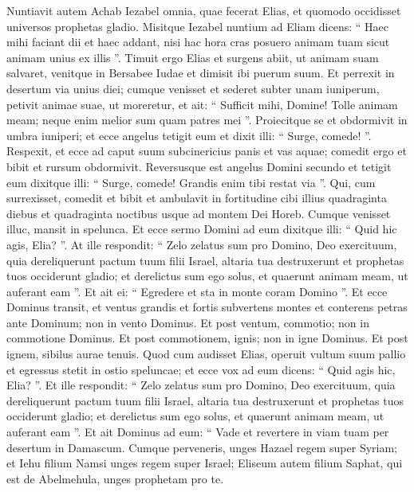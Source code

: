 \begin{biblechapter}
\begin{biblechapter}
\begin{biblechapter}
\begin{biblechapter}
\begin{biblechapter}
\begin{biblechapter}
\begin{biblechapter}
\begin{biblechapter}
\begin{biblechapter}
\begin{biblechapter}
\begin{biblechapter}
\begin{biblechapter}
\begin{biblechapter}
\begin{biblechapter}
\begin{biblechapter}
\begin{biblechapter}
\begin{biblechapter}
\begin{biblechapter}
\begin{biblechapter}
\verse Nuntiavit autem Achab Iezabel omnia, quae fecerat Elias, et quomodo occidisset universos prophetas gladio. 
\verse Misitque Iezabel nuntium ad Eliam dicens: “ Haec mihi faciant dii et haec addant, nisi hac hora cras posuero animam tuam sicut animam unius ex illis ”. 
\verse Timuit ergo Elias et surgens abiit, ut animam suam salvaret, venitque in Bersabee Iudae et dimisit ibi puerum suum. 
\verse Et perrexit in desertum via unius diei; cumque venisset et sederet subter unam iuniperum, petivit animae suae, ut moreretur, et ait: “ Sufficit mihi, Domine! Tolle animam meam; neque enim melior sum quam patres mei ”. 
\verse Proiecitque se et obdormivit in umbra iuniperi; et ecce angelus tetigit eum et dixit illi: “ Surge, comede! ”. 
\verse Respexit, et ecce ad caput suum subcinericius panis et vas aquae; comedit ergo et bibit et rursum obdormivit. 
 \verse Reversusque est angelus Domini secundo et tetigit eum dixitque illi: “ Surge, comede! Grandis enim tibi restat via ”. 
\verse Qui, cum surrexisset, comedit et bibit et ambulavit in fortitudine cibi illius quadraginta diebus et quadraginta noctibus usque ad montem Dei Horeb.
 \verse Cumque venisset illuc, mansit in spelunca. Et ecce sermo Domini ad eum dixitque illi: “ Quid hic agis, Elia? ”. 
\verse At ille respondit: “ Zelo zelatus sum pro Domino, Deo exercituum, quia dereliquerunt pactum tuum filii Israel, altaria tua destruxerunt et prophetas tuos occiderunt gladio; et derelictus sum ego solus, et quaerunt animam meam, ut auferant eam ”. 
\verse Et ait ei: “ Egredere et sta in monte coram Domino ”. Et ecce Dominus transit, et ventus grandis et fortis subvertens montes et conterens petras ante Dominum; non in vento Dominus. Et post ventum, commotio; non in commotione Dominus. 
\verse Et post commotionem, ignis; non in igne Dominus. Et post ignem, sibilus aurae tenuis. 
\verse Quod cum audisset Elias, operuit vultum suum pallio et egressus stetit in ostio speluncae; et ecce vox ad eum dicens: “ Quid agis hic, Elia? ”. 
 \verse Et ille respondit: “ Zelo zelatus sum pro Domino, Deo exercituum, quia dereliquerunt pactum tuum filii Israel, altaria tua destruxerunt et prophetas tuos occiderunt gladio; et derelictus sum ego solus, et quaerunt animam meam, ut auferant eam ”.
 \verse Et ait Dominus ad eum: “ Vade et revertere in viam tuam per desertum in Damascum. Cumque perveneris, unges Hazael regem super Syriam; 
\verse et Iehu filium Namsi unges regem super Israel; Eliseum autem filium Saphat, qui est de Abelmehula, unges prophetam pro te. 

\end{biblechapter}
\end{biblechapter}
\end{biblechapter}
\end{biblechapter}
\end{biblechapter}
\end{biblechapter}
\end{biblechapter}
\end{biblechapter}
\end{biblechapter}
\end{biblechapter}
\end{biblechapter}
\end{biblechapter}
\end{biblechapter}
\end{biblechapter}
\end{biblechapter}
\end{biblechapter}
\end{biblechapter}
\end{biblechapter}
\end{biblechapter}
